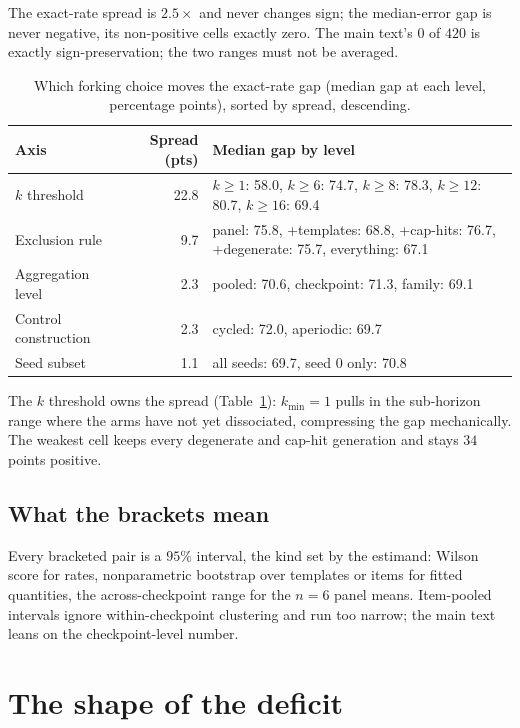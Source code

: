 The exact-rate spread is $2.5\times$ and never changes sign; the median-error gap is never
negative, its non-positive cells exactly zero. The main text's $0$ of $420$ is exactly
sign-preservation; the two ranges must not be averaged.

\begin{table}[htbp]
\centering
\caption{Which forking choice moves the exact-rate gap (median gap at each
level, percentage points), sorted by spread, descending.}
\label{tab:hier-axis}
\small
\begin{tabular}{@{}l r p{6.6cm}@{}}
\toprule
Axis & Spread (pts) & Median gap by level \\
\midrule
$k$ threshold & 22.8 & $k{\ge}1$: 58.0, $k{\ge}6$: 74.7, $k{\ge}8$: 78.3, $k{\ge}12$: 80.7, $k{\ge}16$: 69.4 \\
Exclusion rule & 9.7 & panel: 75.8, +templates: 68.8, +cap-hits: 76.7, +degenerate: 75.7, everything: 67.1 \\
Aggregation level & 2.3 & pooled: 70.6, checkpoint: 71.3, family: 69.1 \\
Control construction & 2.3 & cycled: 72.0, aperiodic: 69.7 \\
Seed subset & 1.1 & all seeds: 69.7, seed 0 only: 70.8 \\
\bottomrule
\end{tabular}
\end{table}

The $k$ threshold owns the spread (Table~\ref{tab:hier-axis}): $k_{\min}=1$ pulls in the
sub-horizon range where the arms have not yet dissociated, compressing the gap mechanically. The
weakest cell keeps every degenerate and cap-hit generation and stays $34$ points positive.

\subsection{What the brackets mean}
\label{sec:brackets}

Every bracketed pair is a $95\%$ interval, the kind set by the estimand: Wilson score for rates,
nonparametric bootstrap over templates or items for fitted quantities, the across-checkpoint
range for the $n=6$ panel means. Item-pooled intervals ignore within-checkpoint clustering and
run too narrow; the main text leans on the checkpoint-level number.

\section{The shape of the deficit}
\label{sec:shape}

